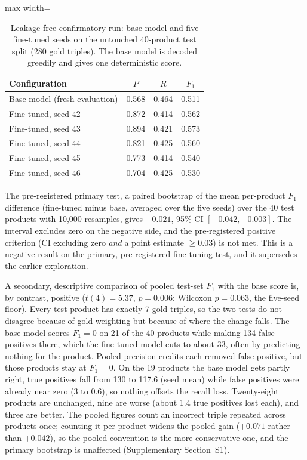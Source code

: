 \documentclass[11pt]{article}
\begin{document}
\begin{table}[htbp]
\centering
\caption{Leakage-free confirmatory run: base model and five fine-tuned
seeds on the untouched 40-product test split (280 gold triples). The base
model is decoded greedily and gives one deterministic score.}
\label{tab:finetune-dec027}
\begin{adjustbox}{max width=\textwidth}
\begin{tabular}{@{}lccc@{}}
\toprule
Configuration & $P$ & $R$ & $F_1$ \\
\midrule
Base model (fresh evaluation) & 0.568 & 0.464 & 0.511 \\
Fine-tuned, seed 42 & 0.872 & 0.414 & 0.562 \\
Fine-tuned, seed 43 & 0.894 & 0.421 & 0.573 \\
Fine-tuned, seed 44 & 0.821 & 0.425 & 0.560 \\
Fine-tuned, seed 45 & 0.773 & 0.414 & 0.540 \\
Fine-tuned, seed 46 & 0.704 & 0.425 & 0.530 \\
\bottomrule
\end{tabular}
\end{adjustbox}
\end{table}

The pre-registered primary test, a paired bootstrap of the mean
per-product $F_1$ difference (fine-tuned minus base, averaged over the
five seeds) over the 40 test products with 10,000 resamples, gives
$-0.021$, 95\% CI $[-0.042, -0.003]$. The interval excludes zero on the
negative side, and the pre-registered positive criterion (CI excluding
zero \emph{and} a point estimate $\ge 0.03$) is not met. This is a
negative result on the primary, pre-registered fine-tuning test, and it
supersedes the earlier exploration.

A secondary, descriptive comparison of pooled test-set $F_1$ with the
base score is, by contrast, positive ($t(4)=5.37$, $p=0.006$; Wilcoxon
$p=0.063$, the five-seed floor). Every test product has exactly 7 gold
triples, so the two tests do not disagree because of gold weighting but
because of where the change falls. The base model scores $F_1=0$ on 21 of
the 40 products while making 134 false positives there, which the
fine-tuned model cuts to about 33, often by predicting nothing for the
product. Pooled precision credits each removed false positive, but those
products stay at $F_1=0$. On the 19 products the base model gets partly
right, true positives fall from 130 to 117.6 (seed mean) while false
positives were already near zero (3 to 0.6), so nothing offsets the
recall loss. Twenty-eight products are unchanged, nine are worse (about
1.4 true positives lost each), and three are better. The pooled figures
count an incorrect triple repeated across products once; counting it per
product widens the pooled gain ($+0.071$ rather than $+0.042$), so the
pooled convention is the more conservative one, and the primary
bootstrap is unaffected (Supplementary Section~S1).
\end{document}
